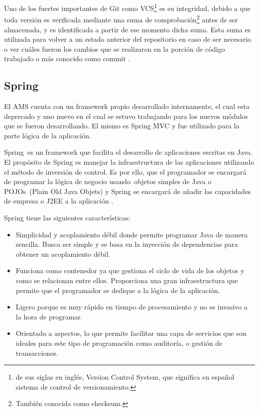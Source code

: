 Uno de los fuertes importantes de Git como VCS\footnote{de sus siglas en inglés, Version Control System, que significa en español sistema de control de versionamiento.} es su integridad, debido a que toda versión es verificada mediante una suma de comprobación\footnote{También conocida como checksum.} antes de ser almacenada, y es identificada a partir de ese momento dicha suma. Esta suma es utilizada para volver a un estado anterior del repositorio en caso de ser necesario o ver cuáles fueron los cambios que se realizaron en la porción de código trabajado o más conocido como commit \citep{chacon2014pro}.

\subsection{Spring}
El AMS cuenta con un framework propio desarrollado internamente, el cual esta deprecado y uno nuevo en el cual se estuvo trabajando para los nuevos módulos que se fueron desarrollando. El mismo es Spring MVC y fue utilizado para la parte lógica de la aplicación.

Spring es un framework que facilita el desarrollo de aplicaciones escritas en Java. El propósito de Spring es manejar la infraestructura de las aplicaciones utilizando el método de inversión de control. Es por ello, que el programador se encargará de programar la lógica de negocio usando objetos simples de Java o POJOs (Plain Old Java Objets) y Spring se encargará de añadir las capacidades de empresa o J2EE a la aplicación \citep{bauer2005hibernate}.

Spring tiene las siguientes características:
\begin{itemize}
	\item Simplicidad y acoplamiento débil donde permite programar Java de manera sencilla. Busca ser simple y se basa en la inyección de dependencias para obtener un acoplamiento débil.
	\item Funciona como contenedor ya que gestiona el ciclo de vida de los objetos y como se relacionan entre ellos. Proporciona una gran infraestructura que permite que el programador se dedique a la lógica de la aplicación.
	\item Ligero porque es muy rápido en tiempo de procesamiento y no es invasivo a la hora de programar.
	\item Orientado a aspectos, lo que permite facilitar una capa de servicios que son ideales para este tipo de programación como auditoría, o gestión de transacciones.
\end{itemize} 

